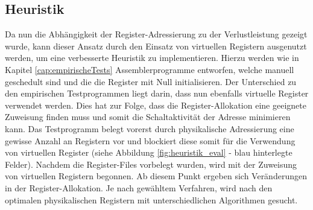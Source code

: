 \subsection{Heuristik}
\label{chap:eval_heuristik}
Da nun die Abhängigkeit der Register-Adressierung zu der Verlustleistung gezeigt wurde, kann dieser Ansatz durch den Einsatz von virtuellen Registern ausgenutzt werden, um eine verbesserte Heuristik zu implementieren. Hierzu werden wie in Kapitel \ref{cap:empirischeTests} Assemblerprogramme entworfen, welche manuell geschedult sind und die die Register mit Null initialisieren. Der Unterschied zu den empirischen Testprogrammen liegt darin, dass nun ebenfalls virtuelle Register verwendet werden.
Dies hat zur Folge, dass die Register-Allokation eine geeignete Zuweisung finden muss und somit die Schaltaktivität der Adresse minimieren kann. Das Testprogramm belegt vorerst durch physikalische Adressierung eine gewisse Anzahl an Registern vor und blockiert diese somit für die Verwendung von virtuellen Register (siehe Abbildung \ref{fig:heuristik_eval} - blau hinterlegte Felder).
Nachdem die Register-Files vorbelegt wurden, wird mit der Zuweisung von virtuellen Registern begonnen. Ab diesem Punkt ergeben sich Veränderungen in der Register-Allokation. Je nach gewähltem Verfahren, wird nach den optimalen physikalischen Registern mit unterschiedlichen Algorithmen gesucht. 

